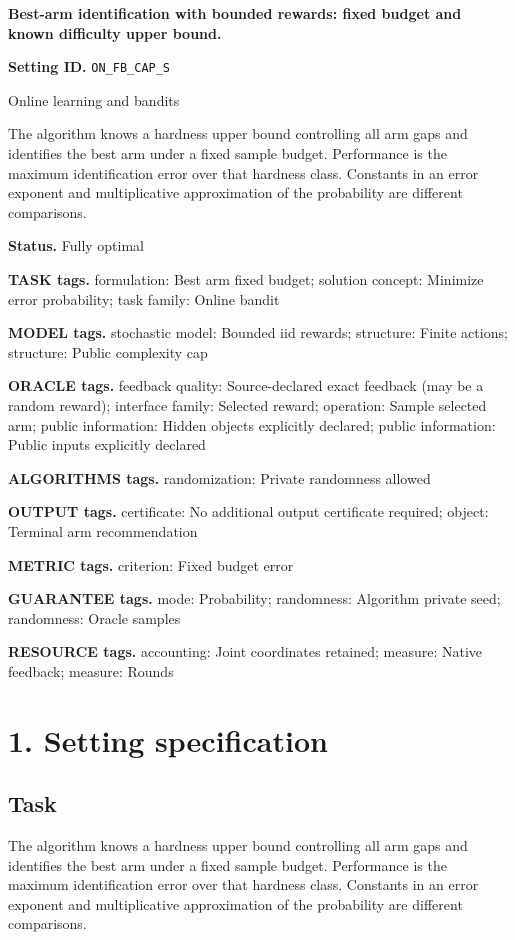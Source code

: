 \documentclass[10pt,a4paper]{article}
\begin{document}
\raggedright

{\LARGE\bfseries\sffamily\color{AtlasNavy} Best-arm identification with bounded rewards: fixed budget and known difficulty upper bound.\par}\vspace{5pt}
\textbf{Setting ID.} \texttt{ON\_\allowbreak{}FB\_\allowbreak{}CAP\_\allowbreak{}S}

Online learning and bandits

The algorithm knows a hardness upper bound controlling all arm gaps and identifies the best arm under a fixed sample budget. Performance is the maximum identification error over that hardness class. Constants in an error exponent and multiplicative approximation of the probability are different comparisons.

\textbf{Status.} Fully optimal

\textbf{TASK tags.} formulation: Best arm fixed budget; solution concept: Minimize error probability; task family: Online bandit

\textbf{MODEL tags.} stochastic model: Bounded iid rewards; structure: Finite actions; structure: Public complexity cap

\textbf{ORACLE tags.} feedback quality: Source-declared exact feedback (may be a random reward); interface family: Selected reward; operation: Sample selected arm; public information: Hidden objects explicitly declared; public information: Public inputs explicitly declared

\textbf{ALGORITHMS tags.} randomization: Private randomness allowed

\textbf{OUTPUT tags.} certificate: No additional output certificate required; object: Terminal arm recommendation

\textbf{METRIC tags.} criterion: Fixed budget error

\textbf{GUARANTEE tags.} mode: Probability; randomness: Algorithm private seed; randomness: Oracle samples

\textbf{RESOURCE tags.} accounting: Joint coordinates retained; measure: Native feedback; measure: Rounds

\section{1. Setting specification}
\subsection{Task}
The algorithm knows a hardness upper bound controlling all arm gaps and identifies the best arm under a fixed sample budget. Performance is the maximum identification error over that hardness class. Constants in an error exponent and multiplicative approximation of the probability are different comparisons.
\end{document}
